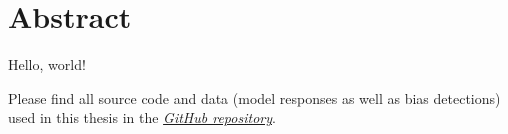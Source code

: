 \section*{Abstract}
\par Hello, world!

\vfill
\begin{flushbottom}
\par Please find all source code and data (model responses as well as bias detections) used in this thesis in the 
\href{https://github.com/maxjmohr/MSc_04_Master_Thesis}{\textit{GitHub repository}}.
\end{flushbottom}
